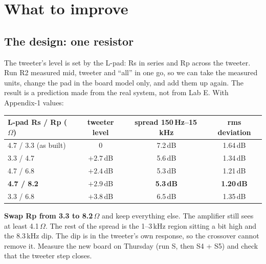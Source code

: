 \documentclass[11pt,a4paper]{article}
\begin{document}
\section{What to improve}\label{sec:fix}
\subsection*{The design: one resistor}
The tweeter's level is set by the L-pad: Rs in series and Rp across the tweeter. Run R2 measured mid,
tweeter and ``all'' in one go, so we can take the measured units, change the pad in the board model
only, and add them up again. The result is a prediction made from the real system, not from Lab E.
With Appendix-1 values:
\begin{center}\small
\begin{tabular}{@{}lccc@{}}\toprule
L-pad Rs / Rp ($\Omega$) & tweeter level & spread 150\,Hz--15\,kHz & rms deviation\\\midrule
4.7 / 3.3 (as built) & 0 & 7.2\,dB & 1.64\,dB\\
3.3 / 4.7 & $+2.7$\,dB & 5.6\,dB & 1.34\,dB\\
4.7 / 6.8 & $+2.4$\,dB & 5.3\,dB & 1.21\,dB\\
\textbf{4.7 / 8.2} & $\mathbf{+2.9}$\,dB & \textbf{5.3\,dB} & \textbf{1.20\,dB}\\
3.3 / 6.8 & $+3.8$\,dB & 6.5\,dB & 1.35\,dB\\\bottomrule
\end{tabular}
\end{center}
\textbf{Swap Rp from 3.3 to 8.2\,$\Omega$} and keep everything else. The amplifier still sees at least
4.1\,$\Omega$. The rest of the spread is the 1--3\,kHz region sitting a bit high and the 8.3\,kHz dip. The dip is
in the tweeter's own response, so the crossover cannot remove it. Measure the new board on Thursday
(run S, then S4 + S5) and check that the tweeter step closes.
\end{document}
